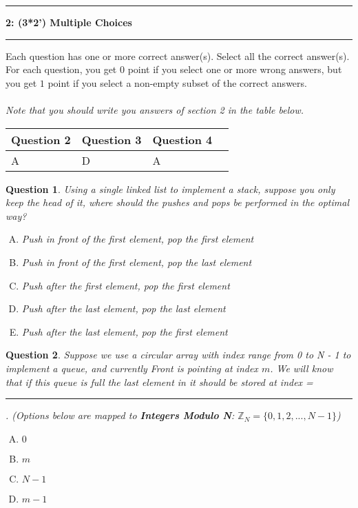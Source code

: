 \documentclass{article}
\newcommand\question[2]{\vspace{.25in}\hrule\textbf{#1: #2}\vspace{.5em}\hrule\vspace{.10in}}
\newtheorem{Q}{Question}
\begin{document}
\pagebreak


\question{2}{(3*2') Multiple Choices}

Each question has one or more correct answer(s). Select all the correct answer(s). For each question, you get $0$ point if you select one or more wrong answers, but you get $1$ point if you select a non-empty subset of the correct answers.\\ \\
\textit{Note that you should write you answers of section 2 in the table below.}
\begin{table}[htbp]
	\begin{tabular}{|p{2cm}|p{2cm}|p{2cm}|p{2cm}|}
		\hline
		Question 2 & Question 3 & Question 4 \\
		\hline
		A          & D          & A          \\
		\hline
	\end{tabular}
\end{table}

\begin{Q}
	Using a single linked list to implement a stack, suppose you only keep the head of it, where should the pushes and pops be performed in the optimal way?
	\begin{enumerate}[(A)]
		\item Push in front of the first element, pop the first element
		\item Push in front of the first element, pop the last element
		\item Push after the first element, pop the first element
		\item Push after the last element, pop the last element
		\item Push after the last element, pop the first element
	\end{enumerate}
\end{Q}

\begin{Q}
	Suppose we use a circular array with index range from 0 to N - 1 to implement a queue, and currently Front is pointing at index $m$. We will know that if this queue is full the last element in it should be stored at index = \rule[-3pt]{1cm}{0.05em}. (Options below are mapped to \textbf{Integers Modulo N}: $\mathbb{Z}_N = \{0, 1, 2, ..., N-1\}$)
	\begin{enumerate}[(A)]
		\item $0$
		\item $m$
		\item $N-1$
		\item $m-1$
	\end{enumerate}
\end{Q}
\end{document}
